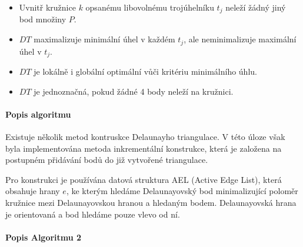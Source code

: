 \documentclass[11pt]{article}
\begin{document}
\begin{itemize}
\item Uvnitř kružnice $k$ opsanému libovolnému trojúhelníku $t_{j}$ neleží žádný jiný bod množiny $P$.
\item $DT$ maximalizuje minimální úhel v každém $t_{j}$, ale neminimalizuje maximální úhel v $t_{j}$. 
\item $DT$ je lokálně i globální optimální vůči kritériu minimálního úhlu.
\item $DT$ je jednoznačná, pokud žádné 4 body neleží na kružnici.

\end{itemize}

\paragraph{Popis algoritmu}
Existuje několik metod kontruskce Delaunayho triangulace. V této úloze však byla implementována metoda inkrementální konstrukce, která je založena na postupném přidávání bodů do již vytvořené triangulace.

Pro konstrukci je používána datová struktura AEL (Active Edge List), která obsahuje hrany $e$, ke kterým hledáme Delaunayovský bod minimalizující poloměr kružnice mezi Delaunayovskou hranou a hledaným bodem. Delaunayovská hrana je orientovaná a bod hledáme pouze vlevo od ní.

 \paragraph{Popis Algoritmu 2}
 
\end{document}
